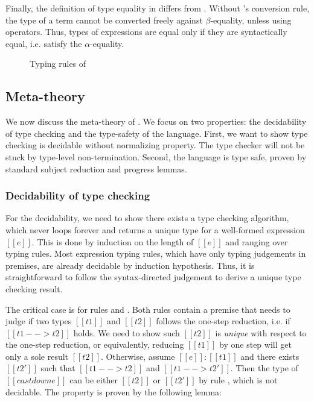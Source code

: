 Finally, the definition of type equality in \ecore differs from \cc. Without \cc's conversion rule, the type of a term cannot be converted freely against $\beta$-equality, unless using \cast operators. Thus, types of expressions are equal only if they are syntactically equal, i.e. satisfy the $\alpha$-equality.

\begin{figure}
    \ottdefnctx{}
    \ottdefnexpr{}
    \caption{Typing rules of \ecore}
    \label{fig:ecore:typing}
\end{figure}

\subsection{Meta-theory}\label{sec:ecore:meta}
We now discuss the meta-theory of \ecore. We focus on two properties: the decidability of type checking and the type-safety of the language. First, we want to show type checking \ecore is decidable without normalizing property. The type checker will not be stuck by type-level non-termination. Second, the language is type safe, proven by standard subject reduction and progress lemmas.

\subsubsection{Decidability of type checking}
For the decidability, we need to show there exists a type checking algorithm, which never loops forever and returns a unique type for a well-formed expression $[[e]]$. This is done by induction on the length of $[[e]]$ and ranging over typing rules. Most expression typing rules, which have only typing judgements in premises, are already decidable by induction hypothesis. Thus, it is straightforward to follow the syntax-directed judgement to derive a unique type checking result.

The critical case is for rules  and . Both rules contain a premise that needs to judge if two types $[[t1]]$ and $[[t2]]$ follows the one-step reduction, i.e. if $[[t1 --> t2]]$ holds. We need to show such $[[t2]]$ is \emph{unique} with respect to the one-step reduction, or equivalently, reducing $[[t1]]$ by one step will get only a sole result $[[t2]]$. Otherwise, assume $[[e]]:[[t1]]$ and there exists $[[t2']]$ such that $[[t1 --> t2]]$ and $[[t1 --> t2']]$. Then the type of $[[castdown e]]$ can be either $[[t2]]$ or $[[t2']]$ by rule , which is not decidable. The property is proven by the following lemma:

